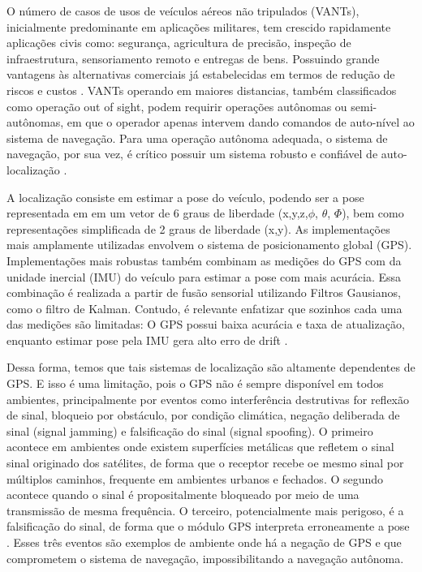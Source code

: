 O número de casos de usos de veículos aéreos não tripulados (VANTs), inicialmente predominante em aplicações militares, tem crescido rapidamente aplicações civis como: segurança, agricultura de precisão, inspeção de infraestrutura, sensoriamento remoto e entregas de bens. Possuindo grande vantagens às alternativas comerciais já estabelecidas em termos de redução de riscos e custos \cite{8682048}. VANTs operando em maiores distancias, também classificados como operação out of sight, podem requirir operações autônomas ou semi-autônomas, em que o operador apenas intervem dando comandos de auto-nível ao sistema de navegação. Para uma operação autônoma adequada, o sistema de navegação, por sua vez, é crítico possuir um sistema robusto e confiável de auto-localização \cite{COUTURIER2021103666}.

A localização consiste em estimar a pose do veículo, podendo ser a pose representada em em um vetor de 6 graus de liberdade (x,y,z,$\phi$, $\theta$, $\Phi$), bem como representações simplificada de 2 graus de liberdade (x,y).
As implementações mais amplamente utilizadas envolvem o sistema de posicionamento global (GPS). Implementações mais robustas também combinam as medições do GPS com da unidade inercial (IMU) do veículo para estimar a pose com mais acurácia. Essa combinação é realizada a partir de fusão sensorial utilizando Filtros Gausianos, como o filtro de Kalman. Contudo, é relevante enfatizar que sozinhos cada uma das medições são limitadas: O GPS possui baixa acurácia e taxa de atualização, enquanto estimar pose pela IMU gera alto erro de drift \cite{COUTURIER2021103666}.

Dessa forma, temos que tais sistemas de localização são altamente dependentes de GPS. E isso é uma limitação, pois o GPS não é sempre disponível em todos ambientes, principalmente por eventos como interferência destrutivas for reflexão de sinal, bloqueio por obstáculo, por condição climática, negação deliberada de sinal (signal jamming) e falsificação do sinal (signal spoofing).
O primeiro acontece em ambientes onde existem superfícies metálicas que refletem o sinal sinal originado dos satélites, de forma que o receptor recebe oe mesmo sinal por múltiplos caminhos, frequente em ambientes urbanos e fechados. O segundo acontece quando o sinal é propositalmente bloqueado por meio de uma transmissão de mesma frequência. O terceiro, potencialmente mais perigoso, é a falsificação do sinal, de forma que o módulo GPS interpreta erroneamente a pose \cite{6837385}. Esses três eventos são exemplos de ambiente onde há a negação de GPS e que comprometem o sistema de navegação, impossibilitando a navegação autônoma.

